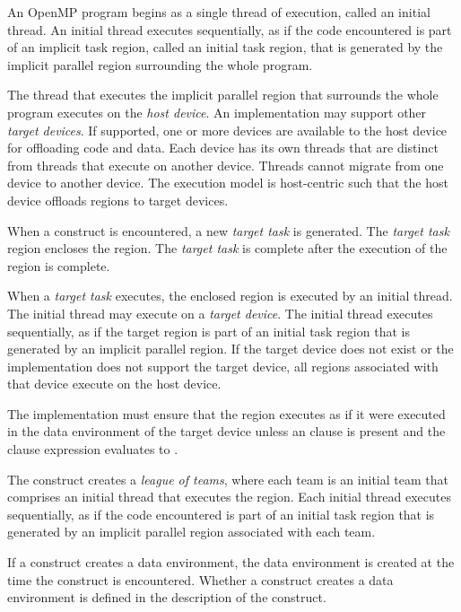 An OpenMP program begins as a single thread of execution, called an initial thread. An 
initial thread executes sequentially, as if the code encountered is part of an implicit task region, called an
initial task region, that is generated by the implicit parallel region surrounding the whole
program.

The thread that executes the implicit parallel region that surrounds the whole program 
executes on the \emph{host device}. An implementation may support 
other \emph{target devices}. If
supported, one or more devices are available to the host device for offloading code and 
data. Each device has its own threads that are distinct from threads that execute on 
another device. Threads cannot migrate from one device to another device. The 
execution model is host-centric such that the host device offloads  regions to
target devices.

When a  construct is encountered, a new \emph{target task} is generated.
The \emph{target task} region encloses the  region. The \emph{target task} is 
complete after the execution of the  region is complete.

When a \emph{target task} executes, the enclosed  region is executed by an initial 
thread.  The initial thread may execute on a \emph{target device}.  The initial thread executes 
sequentially, as if the target region is part of an initial task region that is
generated by an implicit parallel region. If the target device does not exist or the implementation does not support the target
device, all  regions associated with that device execute on the host device.

The implementation must ensure that the  region executes as if it were executed in the data environment of the target device unless an  clause is present and the  clause expression evaluates to .

The  construct creates a \emph{league of teams}, where each team
is an initial team that comprises an initial thread that executes the
 region. Each initial thread executes sequentially, as if the
code encountered is part of an initial task region that is generated by an
implicit parallel region associated with each team.

If a construct creates a data environment, the data environment is created at the time the
construct is encountered. Whether a construct creates a data environment is defined in 
the description of the construct.

